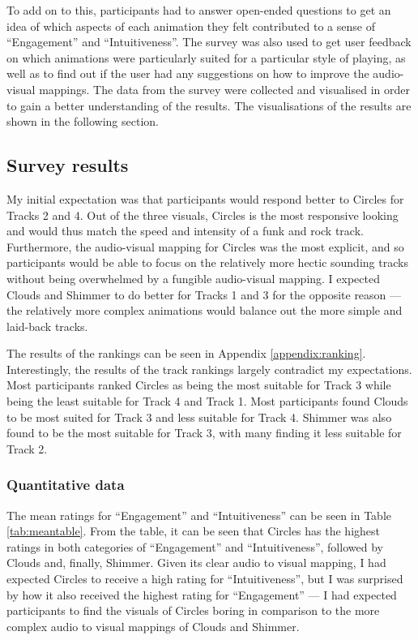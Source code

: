 \documentclass[../initial_thesis.tex]{subfiles}
\begin{document}
To add on to this, participants had to answer open-ended questions to get an idea of which aspects of each animation they felt contributed to a sense of ``Engagement'' and ``Intuitiveness''. The survey was also used to get user feedback on which animations were particularly suited for a particular style of playing, as well as to find out if the user had any suggestions on how to improve the audio-visual mappings. The data from the survey were collected and visualised in order to gain a better understanding of the results. The visualisations of the results are shown in the following section. \par

\subsection{Survey results}
My initial expectation was that participants would respond better to Circles for Tracks 2 and 4. Out of the three visuals, Circles is the most responsive looking and would thus match the speed and intensity of a funk and rock track. Furthermore, the audio-visual mapping for Circles was the most explicit, and so participants would be able to focus on the relatively more hectic sounding tracks without being overwhelmed by a fungible audio-visual mapping. I expected Clouds and Shimmer to do better for Tracks 1 and 3 for the opposite reason --- the relatively more complex animations would balance out the more simple and laid-back tracks. \par

The results of the rankings can be seen in Appendix \ref{appendix:ranking}. Interestingly, the results of the track rankings largely contradict my expectations. Most participants ranked Circles as being the most suitable for Track 3 while being the least suitable for Track 4 and Track 1. Most participants found Clouds to be most suited for Track 3 and less suitable for Track 4. Shimmer was also found to be the most suitable for Track 3, with many finding it less suitable for Track 2.

\subsubsection{Quantitative data}
The mean ratings for ``Engagement'' and ``Intuitiveness'' can be seen in Table \ref{tab:meantable}. From the table, it can be seen that Circles has the highest ratings in both categories of ``Engagement'' and ``Intuitiveness'', followed by Clouds and, finally, Shimmer. Given its clear audio to visual mapping, I had expected Circles to receive a high rating for ``Intuitiveness'', but I was surprised by how it also received the highest rating for ``Engagement'' --- I had expected participants to find the visuals of Circles boring in comparison to the more complex audio to visual mappings of Clouds and Shimmer.\par
\end{document}
